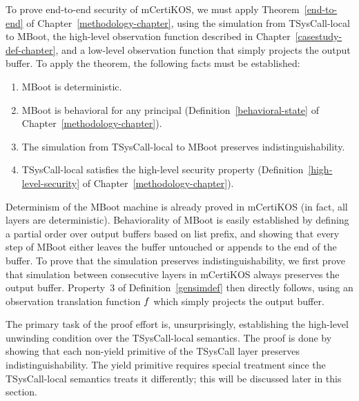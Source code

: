 \label{casestudy-proof-chapter}

To prove end-to-end security of mCertiKOS, we must apply 
Theorem~\ref{end-to-end} of Chapter~\ref{methodology-chapter}, using 
the simulation from TSysCall-local to MBoot, the high-level observation 
function described in Chapter~\ref{casestudy-def-chapter}, and a low-level
observation function that simply projects the output buffer.
To apply the theorem, the following facts must be established:
\begin{enumerate}
\item MBoot is deterministic.
\item MBoot is behavioral for any principal (Definition~\ref{behavioral-state}
of Chapter~\ref{methodology-chapter}).
\item The simulation from TSysCall-local to MBoot preserves
indistinguishability.
\item TSysCall-local satisfies the high-level security
property (Definition~\ref{high-level-security} of Chapter~\ref{methodology-chapter}).
\end{enumerate}
Determinism of the MBoot machine is already proved in mCertiKOS
(in fact, all layers are deterministic).
Behaviorality of MBoot is easily established by defining 
a partial order over output buffers based on list prefix,
and showing that every step of MBoot either leaves the
buffer untouched or appends to the end of the buffer.
To prove that the simulation preserves indistinguishability,
we first prove that simulation between consecutive layers in
mCertiKOS always preserves the output buffer. 
Property~3 of Definition~\ref{gensimdef} then directly follows,
using an observation translation function $\obsrel{R}$
which simply projects the output buffer.

The primary task of the proof effort is, unsurprisingly, 
establishing the high-level unwinding condition over the
TSysCall-local semantics. The proof is done by showing
that each non-yield primitive of the TSysCall layer preserves 
indistinguishability. The yield primitive requires
special treatment since the TSysCall-local semantics treats
it differently; this will be discussed later in this section.

